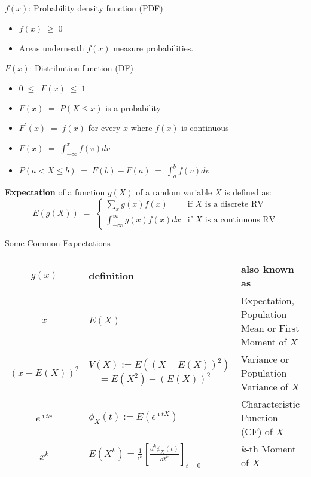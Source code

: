 {\begin{framed}
$f(x)$: Probability density function (PDF)
\begin{itemize}
\item$f(x)\;\geq\;0$
\item Areas underneath $f(x)$ measure probabilities.
\end{itemize}

$F(x)$: Distribution function (DF)
\begin{itemize}
\item $0\;\leq\;\ F(x)\;\leq \;1$
\item $F(x)\;= \;P(X\leq x)$ is a probability
\item $F^{\prime}(x)\;=\;f(x)$ for every $x$ where $f(x)$ is continuous
\item $F(x)\;=\;\displaystyle\int^x_{-\infty}f(v)dv$
\item $P(a<X\leq b)\;=\;F(b)-F(a)\;=\;\displaystyle \int^b_af(v)dv$
\end{itemize}
\end{framed}

\begin{framed}
\textbf{Expectation} of a function $g(X)$ of a random variable $X$ is defined as:
\[
E(g(X))\; =\;
\begin{cases}
\displaystyle \sum_x g(x) f(x) & \text{if $X$ is a discrete RV}\\[12pt]
\displaystyle \int_{-\infty}^{\infty} g(x) f(x) dx & \text{if $X$ is a continuous RV}
\end{cases}
\]
\begin{center}
Some Common Expectations
{\renewcommand{\arraystretch}{1.75}
\begin{tabular}{|c|p{6.0cm}|p{6.0cm}|}
\hline
$g(x)$ & definition & also known as \\
\hline
$x$    & $E(X)$     & Expectation, Population Mean or First Moment of $X$\\
\hline
$(x-E(X))^2$ & $V(X):=E((X-E(X))^2)$ \newline $\quad =E(X^2)-(E(X))^2$ & Variance or Population Variance of $X$\\
\hline
$e^{\imath t x}$ & $\phi_X(t) := E\left( e^{\imath t X}\right)$ & Characteristic Function (CF) of $X$\\
\hline
$x^k$  & $E(X^k) =\frac{1}{\imath^k} \left[\frac{d^k \phi_X(t)}{dt^k}\right]_{t=0} $  & $k$-th Moment of $X$\\
\hline
\end{tabular}
}
\end{center}
\end{framed}

}
